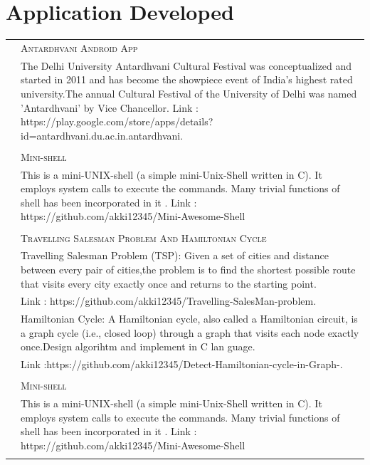 \documentclass[]{deedy-resume-openfont}
\begin{document}
\begin{minipage}[t]{0.66\textwidth}
\section{ \textcolor{gray}{} Application Developed}
\begin{tabular}{r|p{11cm}}
\runsubsection{\textsc{Fab'2015} & \textsc{Antardhvani Android App}}\\&\footnotesize{The Delhi University Antardhvani Cultural Festival was conceptualized and started in 2011 and has become the showpiece event of India’s highest rated university.The annual Cultural Festival of the University of Delhi was named ’Antardhvani’ by Vice Chancellor.
Link : https://play.google.com/store/apps/details?id=antardhvani.du.ac.in.antardhvani.}\\\\
\runsubsection{\textsc{Nov'2014} & \textsc{Mini-shell}}\\&\footnotesize{This is a mini-UNIX-shell (a simple mini-Unix-Shell written in C). It employs system calls to execute the commands. Many trivial functions of shell has been incorporated in it   .
Link : https://github.com/akki12345/Mini-Awesome-Shell}\\\\
\runsubsection{\textsc{dec'2014} & \textsc{Travelling Salesman Problem And Hamiltonian Cycle}}\\&\footnotesize{Travelling Salesman Problem (TSP): Given a set of cities and distance between every pair of cities,the problem is to find the shortest possible route that visits every city exactly once and returns to the starting point.}
\\&\footnotesize{Link : https://github.com/akki12345/Travelling-SalesMan-problem.}
\\&\footnotesize{Hamiltonian Cycle: A Hamiltonian cycle, also called a Hamiltonian circuit, is a graph cycle (i.e., closed loop) through a graph that visits each node exactly once.Design algorihtm and implement in C lan
guage.}
\\&\footnotesize{Link :https://github.com/akki12345/Detect-Hamiltonian-cycle-in-Graph-.}\\\\
\runsubsection{\textsc{Nov'2014} & \textsc{Mini-shell}}\\&\footnotesize{This is a mini-UNIX-shell (a simple mini-Unix-Shell written in C). It employs system calls to execute the commands. Many trivial functions of shell has been incorporated in it   .
Link : https://github.com/akki12345/Mini-Awesome-Shell}\\\\
\end{tabular}

\end{minipage}
\end{document}
